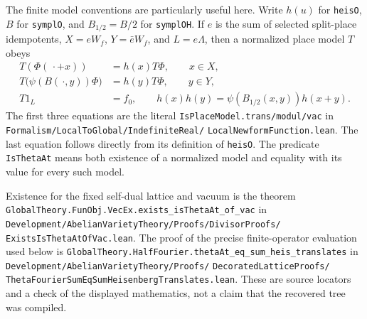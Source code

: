The finite model conventions are particularly useful here.  Write
$h(u)$ for \texttt{heisO}, $B$ for \texttt{symplO}, and
$B_{1/2}=B/2$ for \texttt{symplOH}.  If $e$ is the sum of
selected split-place idempotents, $X=eW_f$, $Y=\bar eW_f$, and
$L=e\Lambda$, then a normalized place model $T$ obeys
\[
 \begin{split}
 T(\Phi(\,\cdot+x))&=h(x)T\Phi,\qquad x\in X,\\
 T\bigl(\psi(B(\,\cdot,y))\Phi\bigr)&=h(y)T\Phi,
                                      \qquad y\in Y,\\
 T1_L&=f_0,\qquad
 h(x)h(y)=\psi(B_{1/2}(x,y))h(x+y).
 \end{split}
 \tag{A12a}
\]
The first three equations are the literal
\texttt{IsPlaceModel.trans/modul/vac} in
\texttt{Formalism/LocalToGlobal/IndefiniteReal/}
\texttt{LocalNewformFunction.lean}.  The last equation follows
directly from its definition of \texttt{heisO}.  The predicate
\texttt{IsThetaAt} means both existence of a normalized model
and equality with its value for every such model.

Existence for the fixed self-dual lattice and vacuum is the
theorem \texttt{GlobalTheory.FunObj.VecEx.exists\_isThetaAt\_of\_vac}
in
\texttt{Development/AbelianVarietyTheory/Proofs/DivisorProofs/}
\texttt{ExistsIsThetaAtOfVac.lean}.  The proof of the precise
finite-operator evaluation used below is
\texttt{GlobalTheory.HalfFourier.thetaAt\_eq\_sum\_heis\_translates}
in
\texttt{Development/AbelianVarietyTheory/Proofs/}
\texttt{DecoratedLatticeProofs/}
\texttt{ThetaFourierSumEqSumHeisenbergTranslates.lean}.
These are source locators and a check of the displayed
mathematics, not a claim that the recovered tree was compiled.

